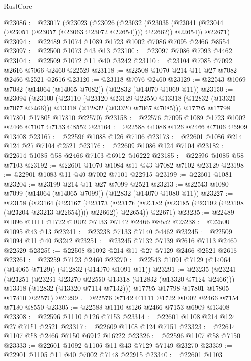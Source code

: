 \begin{lexlean}{RustCore}
\begin{coremodule}
@23086 := @23017
    (@23023
      (@23026
        (@23032 (@23035 (@23041 (@23044 (@23051 (@23057 (@23063 @23072 @22654)))) @22662)) @22654))
      @22671)
@23094 := @22489 @1074 @1089 @1723 @1002 @7086 @7095 @2466 @8554
@23097 := @22500 @1073 @43 @13
@23100 := @23097 @7086 @7093 @4462
@23104 := @22509 @1072 @11 @40 @3242
@23110 := @23104 @7085 @7092 @2616 @7066 @2460 @22529
@23118 := @22508 @1070 @214 @11 @27 @7082 @2466 @2521 @2616
@23120 := @23118 @7076 @2460
@23129 := @22543 @1069 @7082 (@14064 (@14065 @7082)) (@12832 (@14070 @1069 @11))
@23150 := @23094
    (@23100
      (@23110
        (@23120 @23129 @22550 @13318 (@12832 (@13320 @7077 @2466)))
        @13318
        (@12832 (@13320 @7067 @7085)))
      @17795
      @17798
      @17801
      @17805
      @17810
      @22570)
@23158 := @22576 @7095 @1089 @1723 @1002 @2466 @7107 @7133 @8552
@23164 := @22588 @1088 @126 @2466 @7106 @6909 @13408
@23167 := @22596 @1088 @126 @7106
@23173 := @22601 @1086 @214 @124 @27 @7104 @2521
@23176 := @22609 @1086 @124 @7104
@23182 := @22614 @1085 @58 @2466 @7103 @6912 @16222
@23185 := @22596 @1085 @58 @7103
@23192 := @22601 @1070 @1084 @11 @43 @7082 @7102 @23129
@23198 := @22901 @1083 @11 @40 @7002 @7101 @22915
@23199 := @22601 @1081
@23204 := @23199 @214 @11 @27 @7099 @2521
@23213 := @22543 @1080 @7099 (@14064 (@14065 @7099)) (@12832 (@14070 @1080 @11))
@23227 := @23158
    (@23164
      (@23167
        (@23173 (@23176 (@23182 (@23185 (@23192 (@23198 (@23204 @23213 @22654)))) @22662)) @22654))
      @22671)
@23235 := @22489 @1096 @1111 @1722 @1002 @7133 @7142 @2466 @8552
@23238 := @22500 @1095 @43 @13
@23241 := @23238 @7133 @7140 @4462
@23245 := @22509 @1094 @11 @40 @3242
@23251 := @23245 @7132 @7139 @2616 @7113 @2460 @22529
@23259 := @22508 @1092 @214 @11 @27 @7129 @2466 @2521 @2616
@23261 := @23259 @7123 @2460
@23270 := @22543 @1091 @7129 (@14064 (@14065 @7129)) (@12832 (@14070 @1091 @11))
@23291 := @23235
    (@23241
      (@23251
        (@23261 @23270 @22550 @13318 (@12832 (@13320 @7124 @2466)))
        @13318
        (@12832 (@13320 @7114 @7132)))
      @17795
      @17798
      @17801
      @17805
      @17810
      @22570)
@23299 := @22576 @7142 @1111 @1722 @1002 @2466 @7154 @7180 @8550
@23305 := @22588 @1110 @126 @2466 @7153 @6909 @13408
@23308 := @22596 @1110 @126 @7153
@23314 := @22601 @1108 @214 @124 @27 @7151 @2521
@23317 := @22609 @1108 @124 @7151
@23323 := @22614 @1107 @58 @2466 @7150 @6912 @16222
@23326 := @22596 @1107 @58 @7150
@23333 := @22601 @1092 @1106 @11 @43 @7129 @7149 @23270
@23339 := @22901 @1105 @11 @40 @7002 @7148 @22915
@23340 := @22601 @1103

\end{coremodule}
\end{lexlean}
